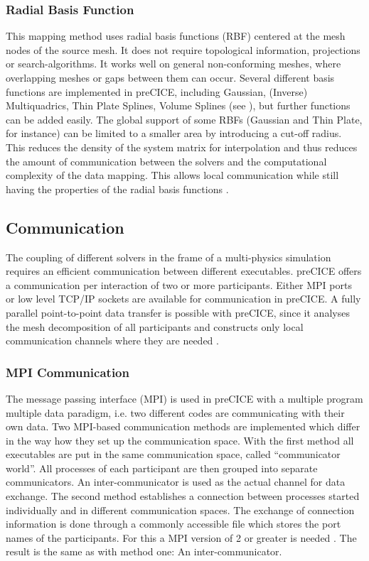   \subsubsection{Radial Basis Function}
   This mapping method uses radial basis functions (RBF) centered at the mesh nodes of the source mesh. It does not require topological information, projections or search-algorithms. It works well on general non-conforming meshes, where overlapping meshes or gaps between them can occur. Several different basis functions are implemented in preCICE, including Gaussian, (Inverse) Multiquadrics, Thin Plate Splines, Volume Splines (see \cite{bungartz2015fully}), but further functions can be added easily. The global support of some RBFs (Gaussian and Thin Plate, for instance) can be limited to a smaller area by introducing a cut-off radius. This reduces the density of the system matrix for interpolation and thus reduces the amount of communication between the solvers and the computational complexity of the data mapping. This allows local communication while still having the properties of the radial basis functions \cite{bungartz2015fully}.


 \subsection{Communication} %
  The coupling of different solvers in the frame of a multi-physics simulation requires an efficient communication between different executables. preCICE offers a communication per interaction of two or more participants. Either MPI ports or low level TCP/IP sockets are available for communication in preCICE. A fully parallel point-to-point data transfer is possible with preCICE, since it analyses the mesh decomposition of all participants and constructs only local communication channels where they are needed \cite{bungartz2015fully}.
 
  \subsubsection{MPI Communication}
   The message passing interface (MPI) is used in preCICE with a multiple program multiple data paradigm, i.e. two different codes are communicating with their own data. Two MPI-based communication methods are implemented which differ in the way how they set up the communication space. With the first method all executables are put in the same communication space, called ``communicator world''. All processes of each participant are then grouped into separate communicators. An inter-communicator is used as the actual channel for data exchange.
   The second method establishes a connection between processes started individually and in different communication spaces. The exchange of connection information is done through a commonly accessible file which stores the port names of the participants. For this a MPI version of 2 or greater is needed \cite{gatzhammer2015efficient}. The result is the same as with method one: An inter-communicator.
   
